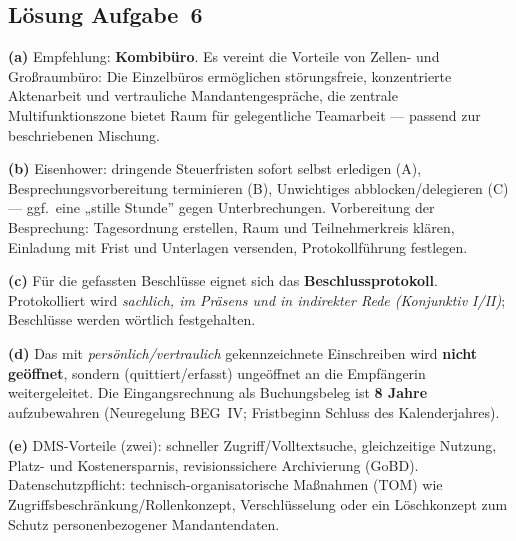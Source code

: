 \documentclass[11pt, a4paper]{article}
\begin{document}
\subsection*{Lösung Aufgabe~6}
\begin{loesung}
\textbf{(a)} Empfehlung: \textbf{Kombibüro}. Es vereint die Vorteile von Zellen- und
Großraumbüro: Die Einzelbüros ermöglichen störungsfreie, konzentrierte Aktenarbeit und
vertrauliche Mandantengespräche, die zentrale Multifunktionszone bietet Raum für
gelegentliche Teamarbeit --- passend zur beschriebenen Mischung.

\textbf{(b)} Eisenhower: dringende Steuerfristen sofort selbst erledigen (A),
Besprechungsvorbereitung terminieren (B), Unwichtiges abblocken/delegieren (C) --- ggf.\
eine „stille Stunde'' gegen Unterbrechungen. Vorbereitung der Besprechung: Tagesordnung
erstellen, Raum und Teilnehmerkreis klären, Einladung mit Frist und Unterlagen versenden,
Protokollführung festlegen.

\textbf{(c)} Für die gefassten Beschlüsse eignet sich das \textbf{Beschlussprotokoll}.
Protokolliert wird \emph{sachlich, im Präsens und in indirekter Rede (Konjunktiv I/II)};
Beschlüsse werden wörtlich festgehalten.

\textbf{(d)} Das mit \emph{persönlich/vertraulich} gekennzeichnete Einschreiben wird
\textbf{nicht geöffnet}, sondern (quittiert/erfasst) ungeöffnet an die Empfängerin
weitergeleitet. Die Eingangsrechnung als Buchungsbeleg ist \textbf{8 Jahre}
aufzubewahren (Neuregelung BEG~IV; Fristbeginn Schluss des Kalenderjahres).

\textbf{(e)} DMS-Vorteile (zwei): schneller Zugriff/Volltextsuche, gleichzeitige Nutzung,
Platz- und Kostenersparnis, revisionssichere Archivierung (GoBD). Datenschutzpflicht:
technisch-organisatorische Maßnahmen (TOM) wie Zugriffsbeschränkung/Rollenkonzept,
Verschlüsselung oder ein Löschkonzept zum Schutz personenbezogener Mandantendaten.
\end{loesung}
\end{document}
